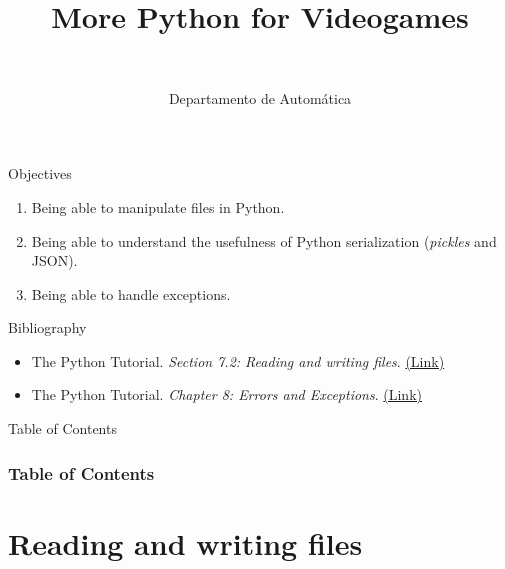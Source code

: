 \documentclass[10pt,compress]{beamer} %
\title[More Python for Videogames]{More Python for Videogames}
\author{\asignatura\\\carrera}
\institute{}
\date{Departamento de Automática}
\begin{document}
{\titlepageBlue
    \begin{frame}
        \titlepage
    \end{frame}
}

\institute{\asignatura}

\begin{frame}[plain]{}
	\begin{block}{Objectives}
		\begin{enumerate}
		\item Being able to manipulate files in Python.
		\item Being able to understand the usefulness of Python serialization (\textit{pickles} and JSON).
		\item Being able to handle exceptions.
		\end{enumerate}
	\end{block}

	\begin{block}{Bibliography}
		\begin{itemize}
			\item The Python Tutorial. \textit{Section 7.2: Reading and writing files}. \href{https://docs.python.org/3/tutorial/inputoutput.html\#reading-and-writing-files}{(Link)}
			\item The Python Tutorial. \textit{Chapter 8: Errors and Exceptions}. \href{https://docs.python.org/3/tutorial/errors.html}{(Link)}
		\end{itemize}
	\end{block}
\end{frame}

{
\begin{frame}[shrink]{Table of Contents}

 	\frametitle{Table of Contents}
  	\begin{multicols}{2}
  		\tableofcontents
    	\end{multicols}

\end{frame}
}


\section{Reading and writing files}
\end{document}
